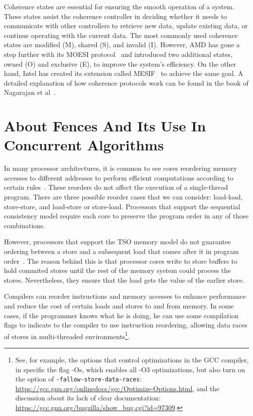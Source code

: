 Coherence states are essential for ensuring the smooth operation of a system. These states assist the coherence controller in deciding whether it needs to communicate with other controllers to retrieve new data, update existing data, or continue operating with the current data. The most commonly used coherence states are modified (M), shared (S), and invalid (I). However, AMD has gone a step further with its MOESI protocol~\cite{devices_amd64} and introduced two additional states, owned (O) and exclusive (E), to improve the system's efficiency. On the other hand, Intel has created its extension called MESIF~\cite{guideintel} to achieve the same goal. A detailed explanation of how coherence protocols work can be found in the book of Nagarajan et al~\cite{DBLP_series_synthesis_2020Nagarajan}.

\section{About Fences And Its Use In Concurrent Algorithms}

In many processor architectures, it is common to see cores reordering memory accesses to different addresses to perform efficient computations according to certain rules~\cite{DBLP_series_synthesis_2020Nagarajan}. These reorders do not affect the execution of a single-thread program. There are three possible reorder cases that we can consider: load-load, store-store, and load-store or store-load. Processors that support the sequential consistency model require each core to preserve the program order in any of those combinations.

However, processors that support the TSO memory model do not guarantee ordering between a store and a subsequent load that comes after it in program order~\cite{DBLP_conf_tphol_OwensSS09,DBLP_journals_cacm_SewellSONM10}. The reason behind this is that processor cores write to store buffers to hold commited stores until the rest of the memory system could process the stores. Nevertheless, they ensure that the load gets the value of the earlier store.

Compilers can reorder instructions and memory accesses to enhance performance and reduce the cost of certain loads and stores to and from memory. In some cases, if the programmer knows what he is doing, he can use some compilation flags to indicate to the compiler to use instruction reordering, allowing data races of stores in multi-threaded environments\footnote{See, for example, the options that control optimizations in the GCC compiler, in specific the flag -Os, which enables all -O3 optimizations, but also turn on the option of \texttt{-fallow-store-data-races}: \url{https://gcc.gnu.org/onlinedocs/gcc/Optimize-Options.html}, and the discussion about its lack of clear documentation: \url{https://gcc.gnu.org/bugzilla/show_bug.cgi?id=97309}.}.

